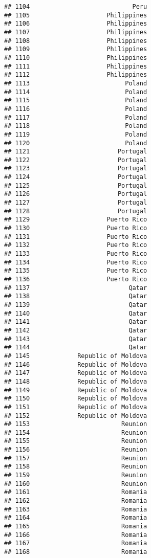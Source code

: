 \documentclass[]{article}
\begin{document}
\begin{verbatim}
## 1104                            Peru
## 1105                     Philippines
## 1106                     Philippines
## 1107                     Philippines
## 1108                     Philippines
## 1109                     Philippines
## 1110                     Philippines
## 1111                     Philippines
## 1112                     Philippines
## 1113                          Poland
## 1114                          Poland
## 1115                          Poland
## 1116                          Poland
## 1117                          Poland
## 1118                          Poland
## 1119                          Poland
## 1120                          Poland
## 1121                        Portugal
## 1122                        Portugal
## 1123                        Portugal
## 1124                        Portugal
## 1125                        Portugal
## 1126                        Portugal
## 1127                        Portugal
## 1128                        Portugal
## 1129                     Puerto Rico
## 1130                     Puerto Rico
## 1131                     Puerto Rico
## 1132                     Puerto Rico
## 1133                     Puerto Rico
## 1134                     Puerto Rico
## 1135                     Puerto Rico
## 1136                     Puerto Rico
## 1137                           Qatar
## 1138                           Qatar
## 1139                           Qatar
## 1140                           Qatar
## 1141                           Qatar
## 1142                           Qatar
## 1143                           Qatar
## 1144                           Qatar
## 1145             Republic of Moldova
## 1146             Republic of Moldova
## 1147             Republic of Moldova
## 1148             Republic of Moldova
## 1149             Republic of Moldova
## 1150             Republic of Moldova
## 1151             Republic of Moldova
## 1152             Republic of Moldova
## 1153                         Reunion
## 1154                         Reunion
## 1155                         Reunion
## 1156                         Reunion
## 1157                         Reunion
## 1158                         Reunion
## 1159                         Reunion
## 1160                         Reunion
## 1161                         Romania
## 1162                         Romania
## 1163                         Romania
## 1164                         Romania
## 1165                         Romania
## 1166                         Romania
## 1167                         Romania
## 1168                         Romania

\end{verbatim}
\end{document}

